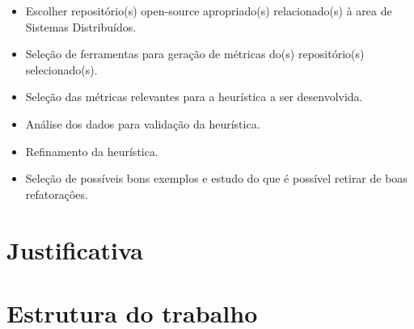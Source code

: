 \begin{itemize}
    \item Escolher repositório(s) open-source apropriado(s) relacionado(s) à area de Sistemas Distribuídos.
    \item Seleção de ferramentas para geração de métricas do(s) repositório(s) selecionado(s).
    \item Seleção das métricas relevantes para a heurística a ser desenvolvida.
    \item Análise dos dados para validação da heurística.
    \item Refinamento da heurística.
    \item Seleção de possíveis bons exemplos e estudo do que é possível retirar de boas refatoraçôes.
\end{itemize}

\section{Justificativa}\label{sec:justificativa}

\section{Estrutura do trabalho}\label{sec:estruturaTrabalho}
